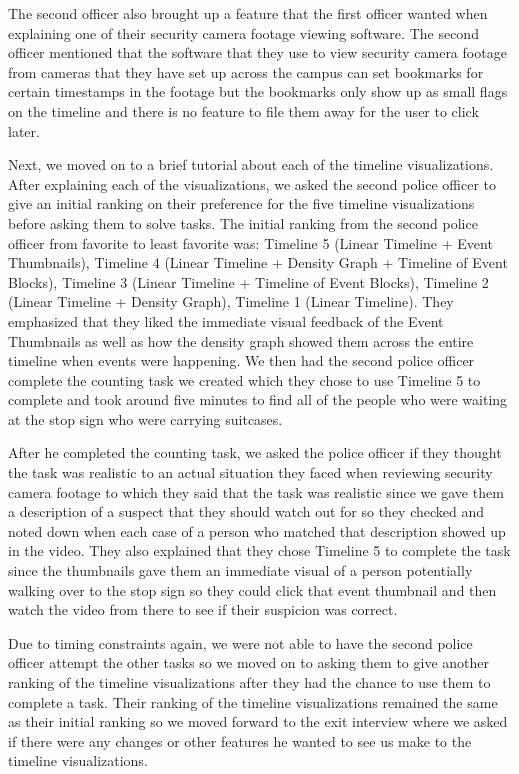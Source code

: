 \documentclass[doublespace,draft,nopageskip]{VTthesis} %
\begin{document}
The second officer also brought up a feature that the first officer wanted when explaining one of their security camera footage viewing software. The second officer mentioned that the software that they use to view security camera footage from cameras that they have set up across the campus can set bookmarks for certain timestamps in the footage but the bookmarks only show up as small flags on the timeline and there is no feature to file them away for the user to click later.

Next, we moved on to a brief tutorial about each of the timeline visualizations. After explaining each of the visualizations, we asked the second police officer to give an initial ranking on their preference for the five timeline visualizations before asking them to solve tasks. The initial ranking from the second police officer from favorite to least favorite was: Timeline 5 (Linear Timeline + Event Thumbnails), Timeline 4 (Linear Timeline + Density Graph + Timeline of Event Blocks), Timeline 3 (Linear Timeline + Timeline of Event Blocks), Timeline 2 (Linear Timeline + Density Graph), Timeline 1 (Linear Timeline). They emphasized that they liked the immediate visual feedback of the Event Thumbnails as well as how the density graph showed them across the entire timeline when events were happening. We then had the second police officer complete the counting task we created which they chose to use Timeline 5 to complete and took around five minutes to find all of the people who were waiting at the stop sign who were carrying suitcases. 

After he completed the counting task, we asked the police officer if they thought the task was realistic to an actual situation they faced when reviewing security camera footage to which they said that the task was realistic since we gave them a description of a suspect that they should watch out for so they checked and noted down when each case of a person who matched that description showed up in the video. They also explained that they chose Timeline 5 to complete the task since the thumbnails gave them an immediate visual of a person potentially walking over to the stop sign so they could click that event thumbnail and then watch the video from there to see if their suspicion was correct.

Due to timing constraints again, we were not able to have the second police officer attempt the other tasks so we moved on to asking them to give another ranking of the timeline visualizations after they had the chance to use them to complete a task. Their ranking of the timeline visualizations remained the same as their initial ranking so we moved forward to the exit interview where we asked if there were any changes or other features he wanted to see us make to the timeline visualizations.
\end{document}
